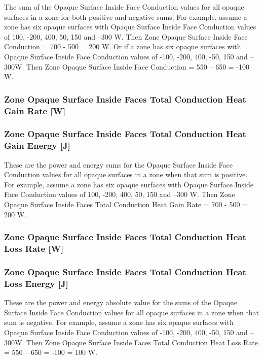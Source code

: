The sum of the Opaque Surface Inside Face Conduction values for all opaque surfaces in a zone for both positive and negative sums. For example, assume a zone has six opaque surfaces with Opaque Surface Inside Face Conduction values of 100, -200, 400, 50, 150 and --300 W. Then Zone Opaque Surface Inside Face Conduction = 700 - 500 = 200 W. Or if a zone has six opaque surfaces with Opaque Surface Inside Face Conduction values of -100, -200, 400, -50, 150 and --300W. Then Zone Opaque Surface Inside Face Conduction = 550 -- 650 = -100 W.

\subsubsection{Zone Opaque Surface Inside Faces Total Conduction Heat Gain Rate {[}W{]}}\label{zone-opaque-surface-inside-faces-total-conduction-heat-gain-rate-w}

\subsubsection{Zone Opaque Surface Inside Faces Total Conduction Heat Gain Energy {[}J{]}}\label{zone-opaque-surface-inside-faces-total-conduction-heat-gain-energy-j}

These are the power and energy sums for the Opaque Surface Inside Face Conduction values for all opaque surfaces in a zone when that sum is positive. For example, assume a zone has six opaque surfaces with Opaque Surface Inside Face Conduction values of 100, -200, 400, 50, 150 and --300 W. Then Zone Opaque Surface Inside Faces Total Conduction Heat Gain Rate = 700 - 500 = 200 W.

\subsubsection{Zone Opaque Surface Inside Faces Total Conduction Heat Loss Rate {[}W{]}}\label{zone-opaque-surface-inside-faces-total-conduction-heat-loss-rate-w}

\subsubsection{Zone Opaque Surface Inside Faces Total Conduction Heat Loss Energy {[}J{]}}\label{zone-opaque-surface-inside-faces-total-conduction-heat-loss-energy-j}

These are the power and energy absolute value for the sums of the Opaque Surface Inside Face Conduction values for all opaque surfaces in a zone when that sum is negative. For example, assume a zone has six opaque surfaces with Opaque Surface Inside Face Conduction values of -100, -200, 400, -50, 150 and --300W. Then Zone Opaque Surface Inside Faces Total Conduction Heat Loss Rate = \textbar{}550 -- 650\textbar{} = \textbar{}-100\textbar{} = 100 W.

